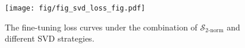 \begin{figure}[t]
  \centering
  \texttt{[image: fig/fig\_svd\_loss\_fig.pdf]}
  \caption{The fine-tuning loss curves under the combination of $\mathcal{S}_{\text{2-norm}}$ and different SVD strategies.}
  \label{fig:svd_loss}
  \vspace{-0.3cm}
\end{figure}